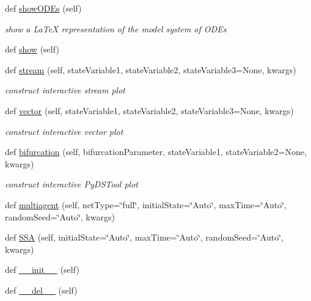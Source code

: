\begin{DoxyCompactItemize}
def \hyperlink{class_mu_mo_t_1_1_mu_mo_tmodel_aa3a519a3aac92f7c132c63fb12d3de13}{show\+O\+D\+Es} (self)
\begin{DoxyCompactList}\small\item\em show a La\+TeX representation of the model system of O\+D\+Es \end{DoxyCompactList}\item 
def \hyperlink{class_mu_mo_t_1_1_mu_mo_tmodel_ab4f4398c3f210fe4ea6e720401357691}{show} (self)
\item 
def \hyperlink{class_mu_mo_t_1_1_mu_mo_tmodel_ae2925a9a37b83608167da0794fe1a2a8}{stream} (self, state\+Variable1, state\+Variable2, state\+Variable3=None, kwargs)
\begin{DoxyCompactList}\small\item\em construct interactive stream plot \end{DoxyCompactList}\item 
def \hyperlink{class_mu_mo_t_1_1_mu_mo_tmodel_aa7a2f83702a081cec49e9f18d8392830}{vector} (self, state\+Variable1, state\+Variable2, state\+Variable3=None, kwargs)
\begin{DoxyCompactList}\small\item\em construct interactive vector plot \end{DoxyCompactList}\item 
def \hyperlink{class_mu_mo_t_1_1_mu_mo_tmodel_a41de1154182c3807821a722c4b91e824}{bifurcation} (self, bifurcation\+Parameter, state\+Variable1, state\+Variable2=None, kwargs)
\begin{DoxyCompactList}\small\item\em construct interactive Py\+D\+S\+Tool plot \end{DoxyCompactList}\item 
def \hyperlink{class_mu_mo_t_1_1_mu_mo_tmodel_a55f7cab206306b09d38863395f186dbc}{multiagent} (self, net\+Type=\char`\"{}full\char`\"{}, initial\+State=\char`\"{}Auto\char`\"{}, max\+Time=\char`\"{}Auto\char`\"{}, random\+Seed=\char`\"{}Auto\char`\"{}, kwargs)
\item 
def \hyperlink{class_mu_mo_t_1_1_mu_mo_tmodel_ac3c78f7f98887f29a4f0d50dd023c465}{S\+SA} (self, initial\+State=\char`\"{}Auto\char`\"{}, max\+Time=\char`\"{}Auto\char`\"{}, random\+Seed=\char`\"{}Auto\char`\"{}, kwargs)
\item 
def \hyperlink{class_mu_mo_t_1_1_mu_mo_tmodel_ae64f0875afe3067b97ba370b354b9213}{\+\_\+\+\_\+init\+\_\+\+\_\+} (self)
\item 
def \hyperlink{class_mu_mo_t_1_1_mu_mo_tmodel_a41a65d7030dd1006b177d0bc24e1a12b}{\+\_\+\+\_\+del\+\_\+\+\_\+} (self)
\end{DoxyCompactItemize}
